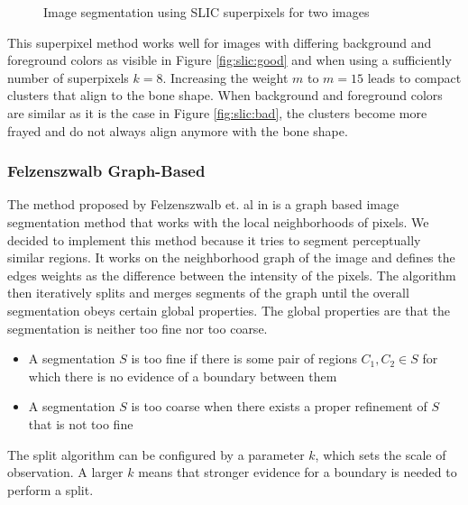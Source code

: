 \documentclass[pdftex,12pt,a4paper]{report}
\begin{document}
\begin{figure}[h]
\begin{subfigure}[b]{0.24\textwidth}
		\subcaption*{}
		\label{}
	\end{subfigure}
	\caption{Image segmentation using SLIC superpixels for two images}
	\label{fig:slic}
\end{figure}

This superpixel method works well for images with differing background and foreground colors as visible in Figure \ref{fig:slic:good} and when using a sufficiently number of superpixels $k=8$. Increasing the weight $m$ to $m=15$ leads to compact clusters that align to the bone shape. When background and foreground colors are similar as it is the case in Figure \ref{fig:slic:bad}, the clusters become more frayed and do not always align anymore with the bone shape.

\subsubsection{Felzenszwalb Graph-Based}

The method proposed by Felzenszwalb et. al in \cite{felzenszwalb2004efficient} is a graph based image segmentation method that works with the local neighborhoods of pixels. We decided to implement this method because it tries to segment perceptually similar regions. It works on the neighborhood graph of the image and defines the edges weights as the difference between the intensity of the pixels. The algorithm then iteratively splits and merges segments of the graph until the overall segmentation obeys certain global properties. The global properties are that the segmentation is neither too fine nor too coarse.

\begin{itemize}
	\item A segmentation $S$ is too fine if there is some pair of regions $C_1, C_2 \in S$ for which there is no evidence of a boundary between them
	\item A segmentation $S$ is too coarse when there exists a proper refinement of $S$ that is not too fine
\end{itemize}

The split algorithm can be configured by a parameter $k$, which sets the scale of observation. A larger $k$ means that stronger evidence for a boundary is needed to perform a split.
\end{document}
